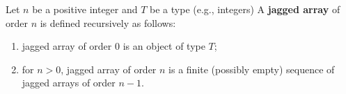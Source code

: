 \begin{definition}
  \label{cmc:jagged:definition}
  Let $n$ be a positive integer and $T$ be a type (e.g., integers)
  A \textbf{jagged array}
  of order $n$ is defined recursively as follows:
  \begin{enumerate}
    \item
      jagged array of order $0$ is an object of type $T$;
    \item
      for $n > 0$, jagged array of order $n$ is a finite (possibly empty)
      sequence of jagged arrays of order $n - 1$.
  \end{enumerate}
\end{definition}
